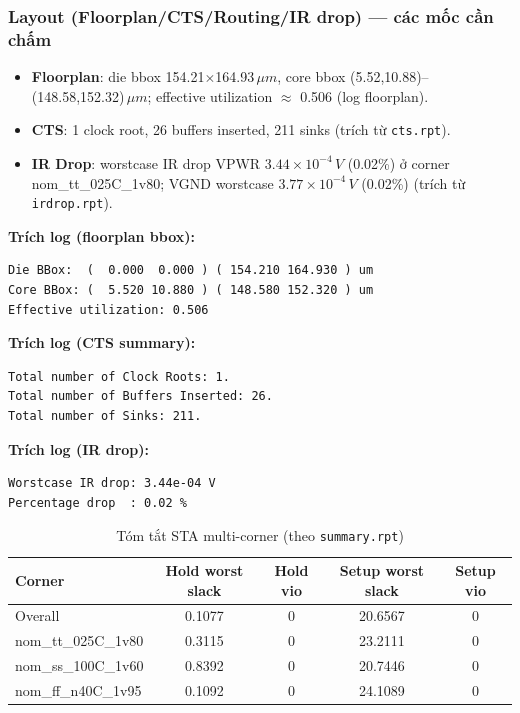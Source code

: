\subsubsection{Layout (Floorplan/CTS/Routing/IR drop) --- các mốc cần chấm}
\begin{itemize}[leftmargin=1.2cm]
    \item \textbf{Floorplan}: die bbox 154.21\(\times\)164.93\,\(\mu m\), core bbox (5.52,10.88)--(148.58,152.32)\,\(\mu m\); effective utilization \(\approx\) 0.506 (log floorplan).
    \item \textbf{CTS}: 1 clock root, 26 buffers inserted, 211 sinks (trích từ \texttt{cts.rpt}).
    \item \textbf{IR Drop}: worstcase IR drop VPWR \(3.44\times 10^{-4}\,V\) (0.02\%) ở corner nom\_tt\_025C\_1v80; VGND worstcase \(3.77\times 10^{-4}\,V\) (0.02\%) (trích từ \texttt{irdrop.rpt}).
\end{itemize}

\textbf{Trích log (floorplan bbox):}
\begin{verbatim}
Die BBox:  (  0.000  0.000 ) ( 154.210 164.930 ) um
Core BBox: (  5.520 10.880 ) ( 148.580 152.320 ) um
Effective utilization: 0.506
\end{verbatim}

\textbf{Trích log (CTS summary):}
\begin{verbatim}
Total number of Clock Roots: 1.
Total number of Buffers Inserted: 26.
Total number of Sinks: 211.
\end{verbatim}

\textbf{Trích log (IR drop):}
\begin{verbatim}
Worstcase IR drop: 3.44e-04 V
Percentage drop  : 0.02 %
\end{verbatim}

\begin{table}[H]
    \centering
    \caption{Tóm tắt STA multi-corner (theo \texttt{summary.rpt})}
    \label{tab:sta_summary_rpt}
    \begin{tabularx}{\textwidth}{|l|c|c|c|c|}
        \hline
        \textbf{Corner} & \textbf{Hold worst slack} & \textbf{Hold vio} & \textbf{Setup worst slack} & \textbf{Setup vio} \\
        \hline
        Overall & 0.1077 & 0 & 20.6567 & 0 \\
        \hline
        nom\_tt\_025C\_1v80 & 0.3115 & 0 & 23.2111 & 0 \\
        \hline
        nom\_ss\_100C\_1v60 & 0.8392 & 0 & 20.7446 & 0 \\
        \hline
        nom\_ff\_n40C\_1v95 & 0.1092 & 0 & 24.1089 & 0 \\
        \hline
    \end{tabularx}
\end{table}

